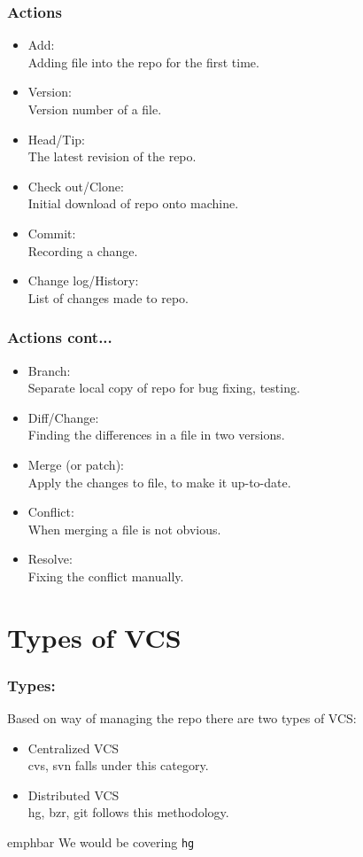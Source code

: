 \documentclass[14pt,compress]{beamer}
\newcommand{\emphbar}[1]
{\begin{beamercolorbox}[rounded=true]{emphbar} 
      {#1}
 \end{beamercolorbox}
}
\newcounter{time}
\newcommand{\typ}[1]{\lstinline{#1}}
\begin{document}
\begin{frame}
  \frametitle{Actions}
  \begin{itemize}
  \item Add:\\
    Adding file into the repo for the first time.
  \item Version:\\
    Version number of a file.
  \item Head/Tip:\\
    The latest revision of the repo.
  \item Check out/Clone:\\
    Initial download of repo onto machine.
  \item Commit:\\
    Recording a change.
  \item Change log/History:\\
    List of changes made to repo.
  \end{itemize}
\end{frame}

\begin{frame}
  \frametitle{Actions cont...}
  \begin{itemize}
  \item Branch:\\
    Separate local copy of repo for bug fixing, testing.
  \item Diff/Change:\\
    Finding the differences in a file in two versions.
  \item Merge (or patch):\\
    Apply the changes to file, to make it up-to-date.
  \item Conflict:\\
    When merging a file is not obvious.
  \item Resolve:\\
    Fixing the conflict manually.
  \end{itemize}
\end{frame}

\section{Types of VCS}

\begin{frame}
  \frametitle{Types:}
  Based on way of managing the repo there are two types of VCS:
  \begin{itemize}
  \item Centralized VCS\\
    cvs, svn falls under this category.
  \item Distributed VCS\\
    hg, bzr, git follows this methodology.
  \end{itemize}
  \emphbar{We would be covering \typ{hg}}
\end{frame}
\end{document}
